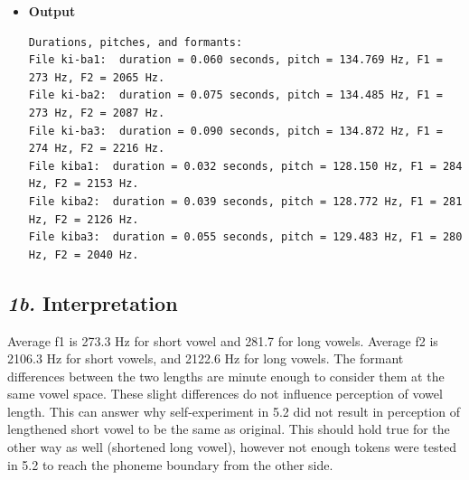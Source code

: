 \documentclass[12pt, english]{article}
\begin{document}
\begin{itemize}
    \item \textbf{Output} \vspace{5pt}
\begin{lstlisting}[xleftmargin=0pt]
Durations, pitches, and formants:
File ki-ba1:  duration = 0.060 seconds, pitch = 134.769 Hz, F1 = 273 Hz, F2 = 2065 Hz.
File ki-ba2:  duration = 0.075 seconds, pitch = 134.485 Hz, F1 = 273 Hz, F2 = 2087 Hz.
File ki-ba3:  duration = 0.090 seconds, pitch = 134.872 Hz, F1 = 274 Hz, F2 = 2216 Hz.
File kiba1:  duration = 0.032 seconds, pitch = 128.150 Hz, F1 = 284 Hz, F2 = 2153 Hz.
File kiba2:  duration = 0.039 seconds, pitch = 128.772 Hz, F1 = 281 Hz, F2 = 2126 Hz.
File kiba3:  duration = 0.055 seconds, pitch = 129.483 Hz, F1 = 280 Hz, F2 = 2040 Hz.
\end{lstlisting} \vspace{10pt}

\end{itemize}


\subsection*{\emph{1b.} Interpretation}

Average f1 is 273.3 Hz for short vowel and 281.7 for long vowels. Average f2 is 2106.3 Hz for short vowels, and 2122.6 Hz for long vowels. The formant differences between the two lengths are minute enough to consider them at the same vowel space. These slight differences do not influence perception of vowel length. This can answer why self-experiment in 5.2 did not result in perception of lengthened short vowel to be the same as original. This should hold true for the other way as well (shortened long vowel), however not enough tokens were tested in 5.2 to reach the phoneme boundary from the other side.
\end{document}
